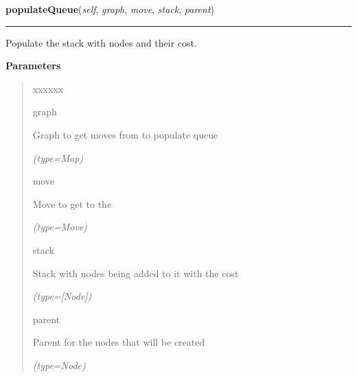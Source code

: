 \hspace{.8\funcindent}\begin{boxedminipage}{\funcwidth}

    \raggedright \textbf{populateQueue}(\textit{self}, \textit{graph}, \textit{move}, \textit{stack}, \textit{parent})

    \vspace{-1.5ex}

    \rule{\textwidth}{0.5\fboxrule}
\setlength{\parskip}{2ex}
    Populate the stack with nodes and their cost.

\setlength{\parskip}{1ex}
      \textbf{Parameters}
      \vspace{-1ex}

      \begin{quote}
        \begin{Ventry}{xxxxxx}

          \item[graph]

          Graph to get moves from to populate queue

            {\it (type=Map)}

          \item[move]

          Move to get to the

            {\it (type=Move)}

          \item[stack]

          Stack with nodes being added to it with the cost

            {\it (type=[Node])}

          \item[parent]

          Parent for the nodes that will be created

            {\it (type=Node)}

        \end{Ventry}

      \end{quote}

    \end{boxedminipage}

    \vspace{0.5ex}

